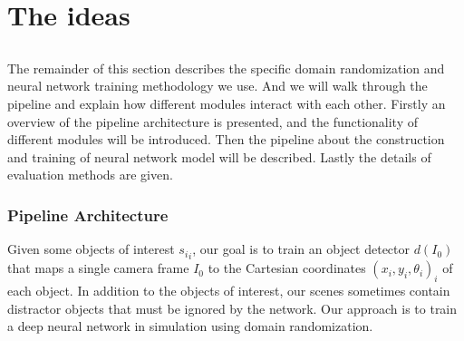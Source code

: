 \part{The ideas}
\chapter{}
\label{sec:Pipeline}
The remainder of this section describes the specific domain randomization and neural network training methodology we use. And we will walk through the pipeline and explain how different modules interact with each other. Firstly an overview of the pipeline architecture is presented, and the functionality of different modules will be introduced. Then the pipeline about the construction and training of neural network model will be described. Lastly the details of evaluation methods are given.


\section{Pipeline Architecture}
Given some objects of interest ${s_i}_i$, our goal is to train an object detector $d(I_0)$ that maps a single camera frame $I_0$ to the Cartesian coordinates ${(x_i, y_i, \theta_i)}_i$ of each object. In addition to the objects of interest, our scenes sometimes contain distractor objects that must be ignored by the network. Our approach is to train a deep neural network in simulation using domain randomization. 

